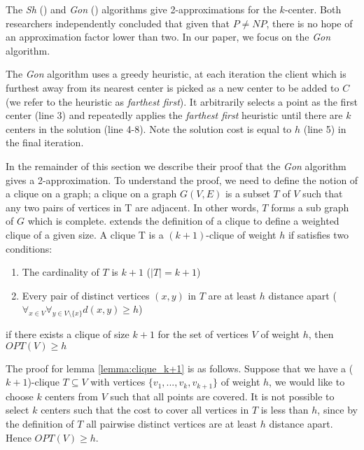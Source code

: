 The \emph{Sh} (\cite{hochbaum_best_1985}) and \emph{Gon} (\cite{gonzalez_clustering_1985}) algorithms give 2-approximations for the $k$-center. Both researchers independently concluded that given that $P\neq NP$, there is no hope of an approximation factor lower than two. In our paper, we focus on the \emph{Gon} algorithm.

The \emph{Gon} algorithm uses a greedy \gls{heuristic}, at each iteration the client which is furthest away from its nearest center is picked as a new center to be added to $C$ (we refer to the \gls{heuristic} as \emph{farthest first}). It arbitrarily selects a point as the first center (line 3) and repeatedly applies the \emph{farthest first} \gls{heuristic} until there are $k$ centers in the solution (line 4-8). Note the solution cost is equal to $h$ (line 5) in the final iteration.



In the remainder of this section we describe their proof that the \emph{Gon} algorithm gives a 2-approximation. To understand the proof, we need to define the notion of a clique on a graph; a clique on a graph $G(V, E)$ is a subset $T$ of $V$ such that any two pairs of vertices in T are adjacent. In other words, $T$ forms a sub graph of $G$ which is complete. \textcite{gonzalez_clustering_1985} extends the definition of a clique to define a weighted clique of a given size. A clique T is a $(k+1)$-clique of weight $h$ if satisfies two conditions:
\begin{enumerate}
    \item The cardinality of $T$ is $k+1$ ($|T|=k+1$)
    \item Every pair of distinct vertices $(x,y)$ in $T$ are at least $h$ distance apart ($\forall _{x\in V}\forall _{y\in V\setminus \{x\}}d(x,y)\geq h$)
\end{enumerate}

\begin{lemma}\label{lemma:clique_k+1}
if there exists a clique of size $k+1$ for the set of vertices $V$ of weight $h$, then $OPT(V)\geq h$
\end{lemma} 

The proof for lemma \ref{lemma:clique_k+1} is as follows. Suppose that we have a ($k+1$)-clique $T\subseteq V$ with vertices $\{v_1, ...,v_k,v_{k+1}\}$ of weight $h$, we would like to choose $k$ centers from $V$ such that all points are covered. It is not possible to select $k$ centers such that the cost to cover all vertices in $T$ is less than $h$, since by the definition of $T$ all pairwise distinct vertices are at least $h$ distance apart. Hence $OPT(V)\geq h$.

